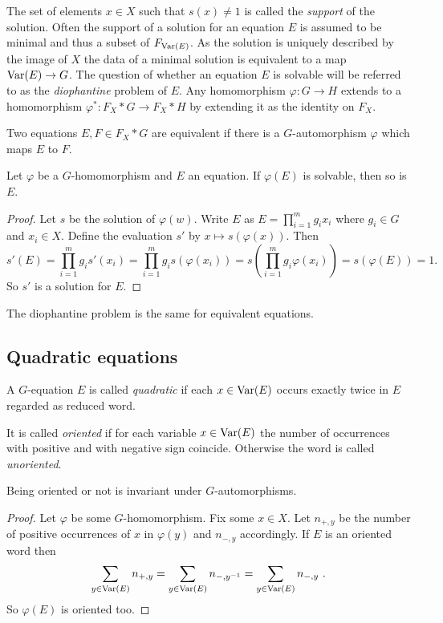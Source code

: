 \documentclass[a4paper,12pt]{article}
\begin{document}
The set of elements $x\in X$ such that $s(x)\neq 1$ is called the \emph{support} of the solution.
Often the support of a solution for an equation $E$ is assumed to be minimal and thus a subset of $F_{\textup{Var}(E)}$. 
As the solution is uniquely described by the image of $X$ the data of a minimal solution is equivalent to a map $\textup{Var}(E) \to G$.
The question of whether an equation $E$ is solvable will be referred to as the \emph{diophantine} problem of $E$.
Any homomorphism $\varphi \colon G \to H$ extends to a homomorphism $\varphi^* \colon F_X*G \to F_X*H$ by extending it as the identity on $F_X$. 
\begin{defi}
 Two equations $E,F\in F_X* G$ are equivalent if there is a $G$-automorphism $\varphi$ which maps $E$ to $F$.
\end{defi}
\begin{lem}
 Let $\varphi$ be a $G$-homomorphism and $E$ an equation. If $\varphi(E)$ is solvable, then so is $E$.
\end{lem}
\begin{proof}
 Let $s$ be the solution of $\varphi(w)$. Write $E$ as $E=\prod_{i=1}^m g_i x_i$ where $g_i\in G$ and $x_i \in X$. Define the evaluation $s'$ by $x\mapsto s(\varphi(x))$. Then
 \[s'(E) = \prod_{i=1}^m g_i s'(x_i)=\prod_{i=1}^m g_i s(\varphi(x_i)) = s\left(\prod_{i=1}^m g_i \varphi(x_i)\right)=s(\varphi(E))=1.\] 
 So $s'$ is a solution for $E$.
\end{proof}
\begin{cor}
 The diophantine problem is the same for equivalent equations.
\end{cor}



\subsection{Quadratic equations}
A $G$-equation $E$ is called \emph{quadratic} if each $x\in \textup{Var}(E)$ occurs exactly twice in $E$ regarded as reduced word. 

It is called \emph{oriented} if for each variable $x\in \textup{Var}(E)$ the number of occurrences with positive and with negative sign coincide.
Otherwise the word is called \emph{unoriented}. 
\begin{lem}
 Being oriented or not is invariant under $G$-automorphisms.
\end{lem}
\begin{proof} 
Let $\varphi$ be some $G$-homomorphism.
 Fix some $x \in X$. Let $n_{+,y}$ be the number of positive occurrences of $x$ in $\varphi(y)$ and $n_{-,y}$ accordingly. If $E$ is an oriented word then 
 \[\sum_{y\in \textup{Var}(E)} n_{+,y} = \sum_{y\in \textup{Var}(E)} n_{-,y^{-1}} = \sum_{y\in \textup{Var}(E)} n_{-,y}\ .\] So $\varphi(E)$ is oriented too. 
\end{proof}
\end{document}
